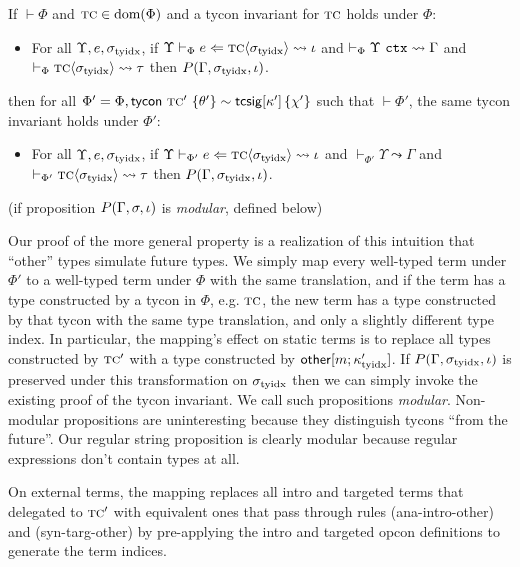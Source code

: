 \begin{theorem}[Conservativity]\label{thm:conservativity} If $\vdash \Phi$ and $\textsc{tc} \in \text{dom}(\Phi)$ and a tycon invariant for $\textsc{tc}$ holds under $\Phi$: \begin{itemize}
\item For all $\Upsilon, e, \sigma_\text{tyidx}$, if $\Upsilon \vdash_{\Phi} e \Leftarrow {\textsc{tc}}\langle\sigma_\text{tyidx}\rangle \leadsto \iota$ and $\vdash_{\Phi} \Upsilon~\mathtt{ctx} \leadsto \Gamma$ and $\vdash_\Phi {{\textsc{tc}}\langle\sigma_\text{tyidx}\rangle} \leadsto \tau$  then $P(\Gamma, \sigma_\text{tyidx}, \iota)$.
\end{itemize} then for all $\Phi' = \Phi, {\sf tycon}~\textsc{tc}' ~\{\theta'\} \sim {\sf tcsig}[\kappa']\,\{\chi'\}$ such that $\vdash \Phi'$, the same tycon invariant holds under $\Phi'$: \begin{itemize}
\item For all $\Upsilon, e, \sigma_\text{tyidx}$, if $\Upsilon \vdash_{\Phi'} e \Leftarrow {\textsc{tc}}\langle\sigma_\text{tyidx}\rangle \leadsto \iota$ and $\vdash_{\Phi'} \Upsilon \leadsto \Gamma$ and $\vdash_{\Phi'}{{\textsc{tc}}\langle\sigma_\text{tyidx}\rangle}\leadsto{\tau}$ then $P(\Gamma, \sigma_\text{tyidx}, \iota)$.
\end{itemize}
(if proposition $P(\Gamma, \sigma, \iota)$ is \emph{modular}, defined below)
\end{theorem}
\begin{proof-sketch}
Our proof of the more general property is a realization of this intuition that ``other'' types simulate future types. We simply map every well-typed term under $\Phi'$ to a well-typed term under $\Phi$ with the same translation, and if the term has a type constructed by a tycon in $\Phi$, e.g. $\textsc{tc}$, the new term has a type constructed by that tycon with the same type translation, and only a slightly different type index. In particular, the mapping's effect on static terms is to replace all types constructed by $\textsc{tc}'$ with a type constructed by ${\sf other}[m;\kappa_\text{tyidx}']$. If $P(\Gamma, \sigma_\text{tyidx}, \iota)$ is preserved under this transformation on $\sigma_\text{tyidx}$ then we can simply invoke the existing proof of the tycon invariant. We call such propositions \emph{modular}. Non-modular propositions are uninteresting because they distinguish tycons ``from the future''. Our regular string proposition is clearly modular because regular expressions don't contain types at all.

On external terms, the mapping replaces all intro and targeted terms that delegated to $\textsc{tc}'$ with equivalent ones that pass through rules (ana-intro-other) and (syn-targ-other) by pre-applying the intro and targeted opcon definitions to generate the term indices.\end{proof-sketch}
